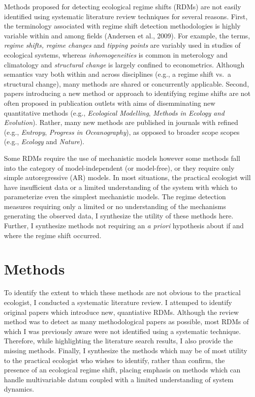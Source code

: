 \documentclass[12pt,twoside,openany]{reedthesis}
\begin{document}
Methods proposed for detecting ecological regime shifts (RDMs) are not easily identified using systematic literature review techniques for several reasons. First, the terminology associated with regime shift detection methodologies is highly variable within and among fields (Andersen et al., 2009). For example, the terms, \emph{regime shifts, regime changes} and \emph{tipping points} are variably used in studies of ecological systems, whereas \emph{inhomogeneities} is common in meterology and climatology and \emph{structural change} is largely confined to econometrics. Although semantics vary both within and across disciplines (e.g., a regime shift vs.~a structural change), many methods are shared or concurrently applicable. Second, papers introducing a new method or approach to identifying regime shifts are not often proposed in publication outlets with aims of disemminating new quantitative methods (e.g., \emph{Ecological Modelling}, \emph{Methods in Ecology and Evolution}). Rather, many new methods are published in journals with refined (e.g., \emph{Entropy}, \emph{Progress in Oceanography}), as opposed to broader scope scopes (e.g., \emph{Ecology} and \emph{Nature}).

Some RDMs require the use of mechanistic models however some methods fall into the category of model-independent (or model-free), or they require only simple autoregressive (AR) models. In most situations, the practical ecologist will have insufficient data or a limited understanding of the system with which to parameterize even the simplest mechanistic models. The regime detection measures requiring only a limited or no understanding of the mechanisms generating the observed data, I synthesize the utility of these methods here. Further, I synthesize methods not requiring an \emph{a priori} hypothesis about if and where the regime shift occurred.

\hypertarget{methods}{%
\section{Methods}\label{methods}}

To identify the extent to which these methods are not obvious to the practical ecologist, I conducted a systematic literature review. I attemped to identify original papers which introduce new, quantiative RDMs. Although the review method was to detect as many methodological papers as possible, most RDMs of which I was previously aware were not identified using a systematic technique. Therefore, while highlighting the literature search results, I also provide the missing methods. Finally, I synthesize the methods which may be of most utility to the practical ecologist who wishes to identify, rather than confirm, the presence of an ecological regime shift, placing emphasis on methods which can handle multivariable datum coupled with a limited understanding of system dynamics.
\end{document}
